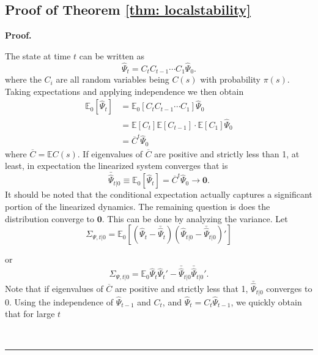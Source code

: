 \documentclass[thmsb,11pt]{article}
\newenvironment{proof}[1][Proof]{\noindent \textbf{#1.} }{\  \rule{0.5em}{0.5em}}
\begin{document}
\subsection{Proof of Theorem \ref{thm: localstability}}
\label{apndx: stability}
 \begin{proof}

 The state at time $t$ can be written as
 	\[
 		\hat{\Psi}_t = C_tC_{t-1}\cdots C_1\hat{\Psi}_0.
 	\]where the $C_i$ are all random variables being $C(s)$ with probability $\pi(s)$. Taking expectations and applying independence we then obtain
% 	
 	\begin{align}
 	\mathbb{E}_0[\hat{\Psi}_t] &= \mathbb{E}_0[C_tC_{t-1}\cdots C_1] \hat{\Psi}_0\\
 	&=\mathbb{E}[C_t] \mathbb{E}[C_{t-1}]\cdot\mathbb{E}[C_1] \hat{\Psi}_0\\
 	&=\overline C^t \hat{\Psi}_0
 	\end{align}
 	where $\overline C = \mathbb{E}C(s)$.  If eigenvalues of $\overline C$ are positive and strictly less than 1, at least, in expectation the linearized system converges that is
 	\begin{equation}
 		 \bar{\hat{\Psi}}_{t|0} \equiv \mathbb{E}_0[\hat{\Psi}_t] = \overline {C}^t \hat{\Psi}_0\to\bm 0.
 	\end{equation}It should be noted that the conditional expectation actually captures a significant portion of the linearized dynamics.
	The remaining question is does the distribution converge to $\bm 0$.  This can be done by analyzing the variance.  Let
 	\[
 		\Sigma_{\Psi,t|0} = \mathbb{E}_0\left[(\hat{\Psi}_t-\bar {\hat{\Psi}}_t)(\hat{\Psi}_{t|0}-\bar {\hat{\Psi}}_{t|0})'\right]
 	\]
 	
 	or
 	\begin{equation}
 	 \Sigma_{\Psi,t|0}=\mathbb{E}_{0}\hat{\Psi}_t\hat{\Psi}_t'- \bar{\hat{\Psi}}_{t|0} \bar{\hat{\Psi}}_{t|0} '.
 	\end{equation}
Note that  if eigenvalues of $\overline C$ are positive and strictly less that 1, $\bar{\hat{\Psi}}_{t|0} $ converges to 0.  Using the independence of $\hat{\Psi}_{t-1}$ and $C_t$, and $\hat{\Psi}_t = C_t \hat{\Psi}_{t-1}$, we quickly obtain that for large $t$
 	

\end{proof}
\end{document}
